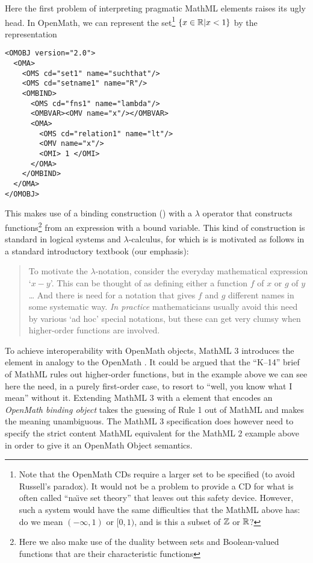 \documentclass{llncs}
\begin{document}
\par
Here the first problem of interpreting pragmatic MathML elements raises its ugly head. In
OpenMath, we can represent the set\footnote{Note that the OpenMath CDs
  require a larger set to be specified (to avoid Russell's paradox). It would not be a
  problem to provide a CD for what is often called ``na\"\i{}ve set theory'' that leaves out
  this safety device. However, such a system would have the same difficulties that the MathML
  above has: do we mean $(-\infty,1)$ or $[0,1)$, and is this a subset of $\mathbb{Z}$ or $\mathbb{R}$?}
$\{x\in\mathbb{R} | x < 1\}$ by the representation
\begin{lstlisting}
<OMOBJ version="2.0">
  <OMA>
    <OMS cd="set1" name="suchthat"/>
    <OMS cd="setname1" name="R"/>
    <OMBIND>
      <OMS cd="fns1" name="lambda"/>
      <OMBVAR><OMV name="x"/></OMBVAR>
      <OMA>
        <OMS cd="relation1" name="lt"/>
        <OMV name="x"/>
        <OMI> 1 </OMI>
      </OMA>
    </OMBIND>
  </OMA>
</OMOBJ>
\end{lstlisting}
This makes use of a binding construction () with a $\lambda$ operator that
constructs functions\footnote{Here we also make use of the duality between sets and
  Boolean-valued functions that are their characteristic functions} from an expression
with a bound variable. This kind of construction is standard in logical systems and
$\lambda$-calculus, for which is is motivated as follows in a standard introductory
textbook (our emphasis):
\begin{quotation}\noindent%
  To motivate the $\lambda$-notation, consider the everyday mathematical expression
  `$x-y$'. This can be thought of as defining either a function $f$ of $x$ or $g$ of $y$
  \dots{} And there is need for a notation that gives $f$ and $g$ different names in some
  systematic way. {\em In practice\/} mathematicians usually avoid this need by various `ad hoc'
  special notations, but these can get very clumsy when higher-order functions are
  involved.\hfill\hbox{\rm\cite[p. 1]{HindleySeldin2008}}
\end{quotation}
To achieve interoperability with OpenMath objects, MathML 3 introduces the {}
element in analogy to the OpenMath {}. It could be argued that the
``K--14'' brief of MathML rules out higher-order functions, but in the example above we
can see here the need, in a purely first-order case, to resort to ``well, you know what I
mean'' without it. Extending MathML 3 with a {} element that encodes an
{\emph{OpenMath binding object}} takes the guessing of Rule 1 out of MathML and makes the
meaning unambiguous. The MathML 3 specification does however need to specify the strict
content MathML equivalent for the MathML 2 example above in order to give it an OpenMath
Object semantics.\iffull{}\fi
\end{document}
